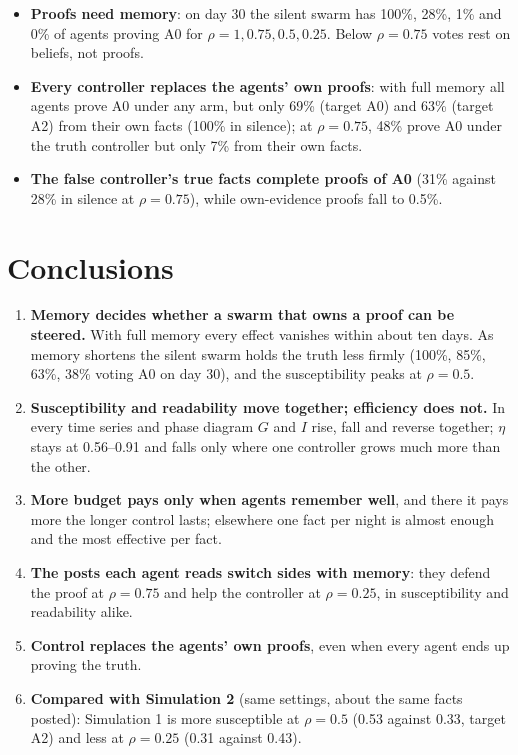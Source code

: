\documentclass[10pt,a4paper]{article}
\begin{document}
\begin{itemize}\itemsep1pt
\item \textbf{Proofs need memory}: on day 30 the silent swarm has 100\%, 28\%, 1\% and 0\% of agents proving A0
  for $\rho = 1, 0.75, 0.5, 0.25$. Below $\rho = 0.75$ votes rest on beliefs, not proofs.
\item \textbf{Every controller replaces the agents' own proofs}: with full memory all agents prove A0 under any
  arm, but only 69\% (target A0) and 63\% (target A2) from their own facts (100\% in silence); at $\rho = 0.75$,
  48\% prove A0 under the truth controller but only 7\% from their own facts.
\item \textbf{The false controller's true facts complete proofs of A0} (31\% against 28\% in silence at
  $\rho = 0.75$), while own-evidence proofs fall to 0.5\%.
\end{itemize}

\section{Conclusions}

\begin{enumerate}\itemsep2pt
\item \textbf{Memory decides whether a swarm that owns a proof can be steered.} With full memory every effect
  vanishes within about ten days. As memory shortens the silent swarm holds the truth less firmly (100\%, 85\%, 63\%,
  38\% voting A0 on day 30), and the susceptibility peaks at $\rho = 0.5$.
\item \textbf{Susceptibility and readability move together; efficiency does not.} In every time series and phase
  diagram $G$ and $I$ rise, fall and reverse together; $\eta$ stays at 0.56--0.91 and falls only where one controller
  grows much more than the other.
\item \textbf{More budget pays only when agents remember well}, and there it pays more the longer control lasts;
  elsewhere one fact per night is almost enough and the most effective per fact.
\item \textbf{The posts each agent reads switch sides with memory}: they defend the proof at $\rho = 0.75$ and help
  the controller at $\rho = 0.25$, in susceptibility and readability alike.
\item \textbf{Control replaces the agents' own proofs}, even when every agent ends up proving the truth.
\item \textbf{Compared with Simulation 2} (same settings, about the same facts posted): Simulation 1 is more
  susceptible at $\rho = 0.5$ (0.53 against 0.33, target A2) and less at $\rho = 0.25$ (0.31 against 0.43).
\end{enumerate}
\end{document}

